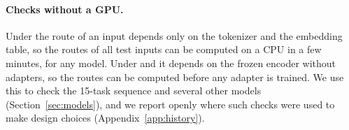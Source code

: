 \paragraph{Checks without a GPU.} Under \cert{} the route of an input depends only on the tokenizer and the
embedding table, so the routes of all test inputs can be computed on a CPU in a few minutes, for
any model. Under \recog{} and \handicap{} it depends on the frozen encoder without adapters, so the routes can be computed before any adapter is trained. We use this to check the 15-task sequence and several other models
(Section~\ref{sec:models}), and we report openly where such checks were used to make design choices
(Appendix~\ref{app:history}).
